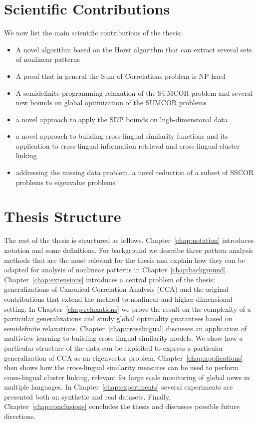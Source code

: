 \section{Scientific Contributions}

We now list the main scientific contributions of the thesis:
\begin{itemize}
\item A novel algorithm based on the Horst algorithm that can extract several sets of nonlinear patterns
\item A proof that in general the Sum of Correlations problem is NP-hard
\item A semidefinite programming relaxation of the SUMCOR problem and
several new bounds on global optimization of the SUMCOR problems
\item a novel approach to apply the SDP bounds on high-dimensional data
\item a novel approach to building cross-lingual similarity functions and its application to cross-lingual information retrieval and cross-lingual cluster linking
\item addressing the missing data problem, a novel reduction of a subset of SSCOR problems to eigenvalue problems
\end{itemize}

\section{Thesis Structure}

The rest of the thesis is structured as follows. Chapter~\ref{chap:notation} introduces notation and some
definitions. For background we describe three pattern analysis methods that are the most relevant
for the thesis and explain how they can be adapted for analysis of nonlinear patterns in Chapter~\ref{chap:background}. Chapter~\ref{chap:extensions}
introduces a central problem of the thesis: generalizations of Canonical Correlation Analysis (CCA) and the original
contributions that extend the method to nonlinear and higher-dimensional setting. In Chapter~\ref{chap:relaxations}
we prove the result on the complexity of a particular generalizations and study global optimality guarantees based
on semidefinite relaxations. Chapter~\ref{chap:crosslingual} discusses an application of multiview learning
to building cross-lingual similarity models. We show how a particular structure of the data can be exploited
to express a particular generalization of CCA as an eigenvector problem. Chapter~\ref{chap:applications} then
shows how the cross-lingual similarity measures can be used to perform cross-lingual cluster linking, relevant
for large scale monitoring of global news in multiple languages. In Chapter~\ref{chap:experiments} several experiments
are presented both on synthetic and real datasets. Finally, Chapter~\ref{chap:conclusions} concludes the thesis
and discusses possible future directions. 